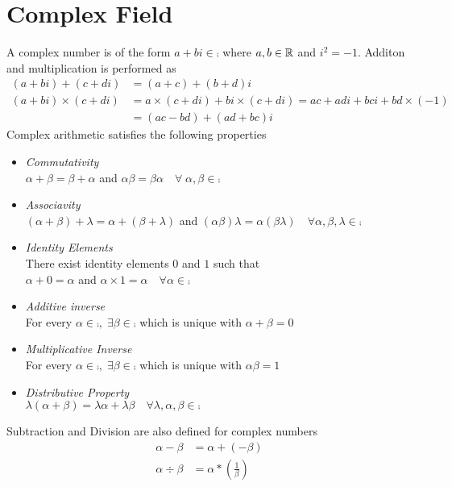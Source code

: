 \documentclass[../../linear_algebra.tex]{subfiles}
\begin{document}
\section{Complex Field} \label{sec:complex}
A complex number is of the form $a + bi \in \comp$ where $a, b \in \mathbb{R}$ and $i^{2} = -1$. Additon and multiplication is performed as
\begin{align*}
     (a + bi) + (c + di) &= (a + c) + (b + d)i\\
     (a + bi) \times (c + di) &= a \times (c + di) + bi \times (c + di)
     = ac + adi + bci + bd \times (-1)\\
     &= (ac - bd) + (ad + bc)i
\end{align*}
Complex arithmetic satisfies the following properties
\begin{itemize}
    \item \emph{Commutativity}\\
    $\alpha + \beta = \beta + \alpha$ and $\alpha \beta = \beta \alpha \quad \forall \; \alpha, \beta \in \comp$
    \item \emph{Associavity}\\
    $(\alpha + \beta) + \lambda = \alpha + (\beta + \lambda)$ and $(\alpha \beta)\lambda = \alpha(\beta \lambda) \quad \forall \alpha, \beta, \lambda \in \comp$
    \item \emph{Identity Elements}\\
    There exist identity elements $0$ and $1$ such that\\
    $\alpha + 0 = \alpha$ and $\alpha \times 1 = \alpha \quad \forall \alpha \in \comp$
    \item \emph{Additive inverse}\\
    For every $\alpha \in \comp, \; \exists \beta \in \comp$ which is unique with $\alpha + \beta = 0$
    \item \emph{Multiplicative Inverse}\\
    For every $\alpha \in \comp, \; \exists \beta \in \comp$ which is unique with $\alpha \beta = 1$
    \item \emph{Distributive Property}\\
    $\lambda(\alpha + \beta) = \lambda \alpha + \lambda \beta \quad \forall \lambda, \alpha, \beta \in \comp$
\end{itemize}

Subtraction and Division are also defined for complex numbers
\begin{align*}
    \alpha - \beta &= \alpha + (-\beta)\\
    \alpha \div \beta &= \alpha * (\frac{1}{\beta}) \tag*{where $1/\beta$ is the multiplicative inverse of $\beta$}
\end{align*}
\end{document}
